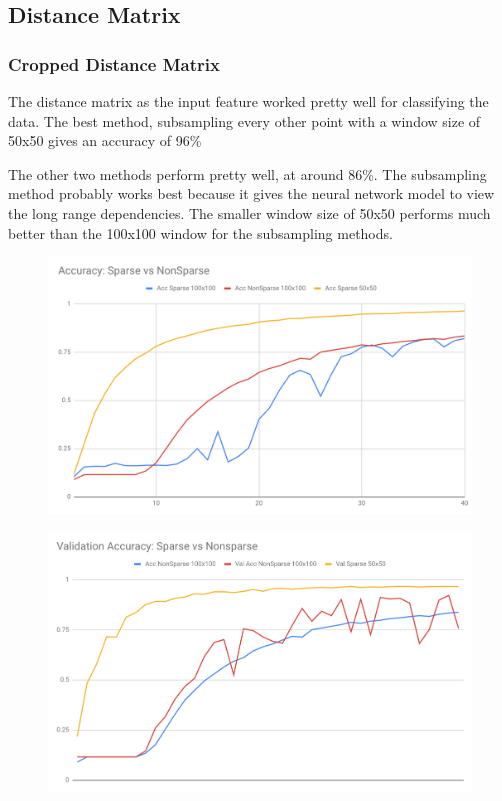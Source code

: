 \documentclass[12pt, a4paper, twocolumn, fullpage]{article}
\theoremstyle{plain}
\theoremstyle{definition}
\theoremstyle{remark}
\begin{document}
\subsection{Distance Matrix}

\subsubsection{Cropped Distance Matrix}
    The distance matrix as the input feature worked pretty well for classifying the data. The best method, subsampling every other point with a window size of 50x50 gives an accuracy of 96\%
    
    The other two methods perform pretty well, at around 86\%.
    The subsampling method probably works best because it gives the neural network model to view the long range dependencies.
    The smaller window size of 50x50 performs much better than the 100x100 window for the subsampling methods.  
    
    \begin{figure}[t]
      \includegraphics[width=\linewidth]{AccSparsevsNonSparse.png}
      \caption{}
      \label{AccSparsevsNonSparse}
    \end{figure}
    
    \begin{figure}[t]
      \includegraphics[width=\linewidth]{ValAccSparsevsNonsparse.png}
      \caption{}
      \label{ValAccSparsevsNonsparse}
    \end{figure}
\end{document}
